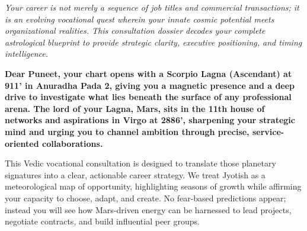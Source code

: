


{\fontsize{9.5}{14}\selectfont\color{DeepSlate}\itshape Your career is not merely a sequence of job titles and commercial transactions; it is an evolving vocational quest wherein your innate cosmic potential meets organizational realities. This consultation dossier decodes your complete astrological blueprint to provide strategic clarity, executive positioning, and timing intelligence.}\par\vspace{3.5mm}

\label{topic1}

{\fontsize{9.5}{13.8}\selectfont\bfseries\color{DeepSlate} Dear Puneet, your chart opens with a Scorpio Lagna (Ascendant) at 9\textdegree{}11' in Anuradha Pada 2, giving you a magnetic presence and a deep drive to investigate what lies beneath the surface of any professional arena. The lord of your Lagna, Mars, sits in the 11th house of networks and aspirations in Virgo at 28\textdegree{}86', sharpening your strategic mind and urging you to channel ambition through precise, service-oriented collaborations.}\par\vspace{2mm}

{\fontsize{9}{13}\selectfont This Vedic vocational consultation is designed to translate those planetary signatures into a clear, actionable career strategy. We treat Jyotish as a meteorological map of opportunity, highlighting seasons of growth while affirming your capacity to choose, adapt, and create. No fear-based predictions appear; instead you will see how Mars-driven energy can be harnessed to lead projects, negotiate contracts, and build influential peer groups.}\par\vspace{1.8mm}

